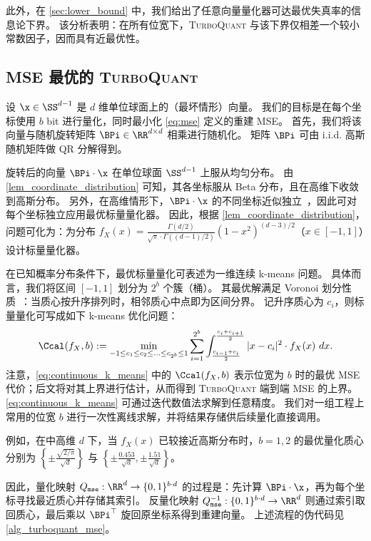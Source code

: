 \documentclass[11pt]{ctexart}
\newcommand{\TurboQuant}{\textsc{TurboQuant}\xspace}
\let\cref\ref
\begin{document}
此外，在 \cref{sec:lower_bound} 中，我们给出了任意向量量化器可达最优失真率的信息论下界。
该分析表明：在所有位宽下，\TurboQuant 与该下界仅相差一个较小常数因子，因而具有近最优性。


\subsection{MSE 最优的 \TurboQuant} \label{sec:mse_turbo_alg}
设 $\x \in \SS^{d-1}$ 是 $d$ 维单位球面上的（最坏情形）向量。
我们的目标是在每个坐标使用 $b$ bit 进行量化，同时最小化 \cref{eq:mse} 定义的重建 MSE。
首先，我们将该向量与随机旋转矩阵 $\BPi \in \RR^{d \times d}$ 相乘进行随机化。
矩阵 $\BPi$ 可由 i.i.d. 高斯随机矩阵做 QR 分解得到。

旋转后的向量 $\BPi \cdot \x$ 在单位球面 $\SS^{d-1}$ 上服从均匀分布。
由 \cref{lem_coordinate_distribution} 可知，其各坐标服从 Beta 分布，且在高维下收敛到高斯分布。
另外，在高维情形下，$\BPi \cdot \x$ 的不同坐标近似独立~\cite{vershynin2018high}，因此可对每个坐标独立应用最优标量量化器。
因此，根据 \cref{lem_coordinate_distribution}，问题可化为：为分布
$f_{X}(x) = \frac{\Gamma(d/2)}{\sqrt{\pi} \cdot \Gamma((d-1)/2)} \left( 1 - x^2 \right)^{(d-3)/2}$（$x \in [-1, 1]$）设计标量量化器。

在已知概率分布条件下，最优标量量化可表述为一维连续 k-means 问题。
具体而言，我们将区间 $[-1,1]$ 划分为 $2^b$ 个簇（桶）。
其最优解满足 Voronoi 划分性质~\cite{lloyd1982least}：当质心按升序排列时，相邻质心中点即为区间分界。
记升序质心为 $c_i$，则标量量化可写成如下 k-means 优化问题：
\begin{equation}\label{eq:continuous_k_means}
    \Ccal(f_X, b) := \min_{-1 \le c_1 \le c_2 \le \ldots \le c_{2^b} \le 1} \sum_{i=1}^{2^b} \int_{\frac{c_{i-1} + c_i}{2}}^{\frac{c_i + c_{i+1}}{2}} |x - c_i|^2 \cdot f_X(x)~dx.
\end{equation}
注意，\cref{eq:continuous_k_means} 中的 $\Ccal(f_X, b)$ 表示位宽为 $b$ 时的最优 MSE 代价；后文将对其上界进行估计，从而得到 \TurboQuant 端到端 MSE 的上界。
\cref{eq:continuous_k_means} 可通过迭代数值法求解到任意精度。
我们对一组工程上常用的位宽 $b$ 进行一次性离线求解，并将结果存储供后续量化直接调用。

例如，在中高维 $d$ 下，当 $f_X(x)$ 已较接近高斯分布时，$b=1,2$ 的最优量化质心分别为
$\left\{ \pm \frac{\sqrt{2/\pi}}{\sqrt{d}} \right\}$ 与 $\left\{ \pm \frac{0.453}{\sqrt{d}}, \pm \frac{1.51}{\sqrt{d}} \right\}$。

因此，量化映射 $Q_{\tt mse}: \RR^d \to \{ 0, 1 \}^{b \cdot d}$ 的过程是：先计算 $\BPi \cdot \x$，再为每个坐标寻找最近质心并存储其索引。
反量化映射 $Q_{\tt mse}^{-1}: \{ 0, 1 \}^{b \cdot d} \to \RR^d$ 则通过索引取回质心，最后乘以 $\BPi^\top$ 旋回原坐标系得到重建向量。
上述流程的伪代码见 \cref{alg_turboquant_mse}。
\end{document}
